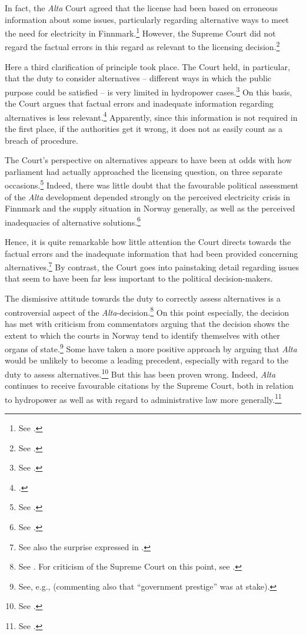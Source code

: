 In fact, the {\it Alta} Court agreed that the license had been based on erroneous information about some issues, particularly regarding alternative ways to meet the need for electricity in Finnmark.\footnote{See \cite[346-357]{alta82}.} However, the Supreme Court did not regard the factual errors in this regard as relevant to the licensing decision.\footnote{See \cite[346]{alta82}.} 

Here a third clarification of principle took place. The Court held, in particular, that the duty to consider alternatives -- different ways in which the public purpose could be satisfied -- is very limited in hydropower cases.\footnote{See \cite[346]{alta82}.} On this basis, the Court argues that factual errors and inadequate information regarding alternatives is less relevant.\footcite[346]{alta82} Apparently, since this information is not required in the first place, if the authorities get it wrong, it does not as easily count as a breach of procedure.

The Court's perspective on alternatives appears to have been at odds with how parliament had actually approached the licensing question, on three separate occasions.\footnote{See \cite[342]{alta82}.} Indeed, there was little doubt that the favourable political assessment of the {\it Alta} development depended strongly on the perceived electricity crisis in Finnmark and the supply situation in Norway generally, as well as the perceived inadequacies of alternative solutions.\footnote{See \cite[338-347]{alta82}.}

Hence, it is quite remarkable how little attention the Court directs towards the factual errors and the inadequate information that had been provided concerning alternatives.\footnote{See also the surprise expressed in \cite[349-351]{eckhoff82}.} By contrast, the Court goes into painstaking detail regarding issues that seem to have been far less important to the political decision-makers.

The dismissive attitude towards the duty to correctly assess alternatives is a controversial aspect of the {\it Alta}-decision.\footnote{See \cite[311]{haagensen02}. For criticism of the Supreme Court on this point, see \cite[580-584]{backer86}.} On this point especially, the decision has met with criticism from commentators arguing that the decision shows the extent to which the courts in Norway tend to identify themselves with other organs of state.\footnote{See, e.g., \cite[64]{graver88} (commenting also that ``government prestige'' was at stake).} Some have taken a more positive approach by arguing that {\it Alta} would be unlikely to become a leading precedent, especially with regard to the duty to assess alternatives.\footnote{See \cite[580-584]{backer86}.} But this has been proven wrong. Indeed, {\it Alta} continues to receive favourable citations by the Supreme Court, both in relation to hydropower as well as with regard to administrative law more generally.\footnote{See \cite{ambassade09,jorpeland11}.}

